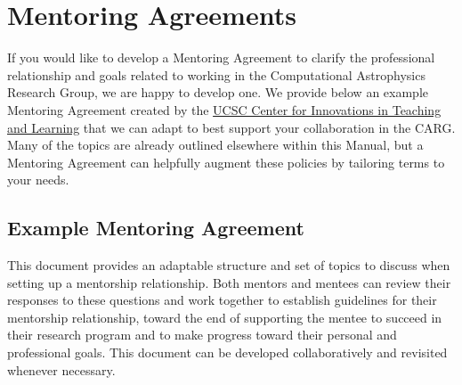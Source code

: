 \section{Mentoring Agreements}
\label{sec:mentoring_agreement}

If you would like to develop a Mentoring Agreement to clarify the
professional relationship and goals related to working in the
Computational Astrophysics Research Group, we are happy to develop one.
We provide below an example Mentoring Agreement created by the
\href{https://graddiv.ucsc.edu/current-students/teaching-resources/citl-info.html}{UCSC Center for Innovations in Teaching and Learning} that we can adapt to best support your 
collaboration in the CARG. Many of the topics are already
outlined elsewhere within this Manual, but a Mentoring Agreement
can helpfully augment these policies by tailoring terms to
your needs.


\subsection{Example Mentoring Agreement}

This document provides an adaptable structure and set of topics to discuss when setting up a mentorship relationship. Both mentors and mentees can review their responses to these questions and work together to establish guidelines for their mentorship relationship, toward the end of supporting the mentee to succeed in their research program and to make progress toward their personal and professional goals. This document can be developed collaboratively and revisited whenever necessary.


